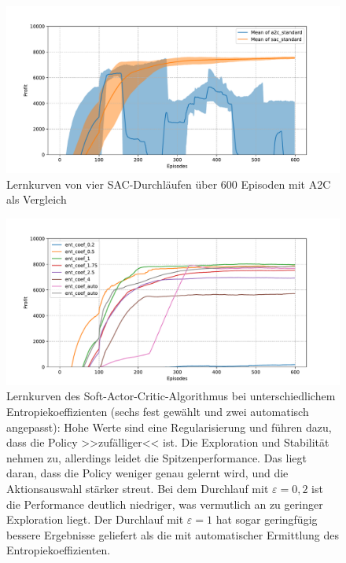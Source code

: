 \begin{figure}[htb]
	\centering
	\includegraphics[width=\textwidth]{appendix/a2c_vs_sac.pdf}
	\caption{Lernkurven von vier SAC-Durchläufen über 600 Episoden mit A2C als Vergleich}
	\label{graphic:SACvsA2CLearningCurve}
\end{figure}
\begin{figure}[htb]
	\centering
	\includegraphics[width=\textwidth]{appendix/sac_temperature.pdf}
	\caption{
		Lernkurven des Soft-Actor-Critic-Algorithmus bei unterschiedlichem Entropiekoeffizienten (sechs fest gewählt und zwei automatisch angepasst):
        Hohe Werte sind eine Regularisierung und führen dazu, dass die Policy >>zufälliger<< ist.
        Die Exploration und Stabilität nehmen zu, allerdings leidet die Spitzenperformance.
        Das liegt daran, dass die Policy weniger genau gelernt wird, und die Aktionsauswahl stärker streut.
        Bei dem Durchlauf mit $\varepsilon=0{,}2$ ist die Performance deutlich niedriger, was vermutlich an zu geringer Exploration liegt.
        Der Durchlauf mit $\varepsilon=1$ hat sogar geringfügig bessere Ergebnisse geliefert als die mit automatischer Ermittlung des Entropiekoeffizienten.
	}
	\label{graphic:SACTemperature}
\end{figure}
